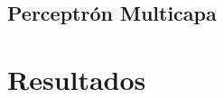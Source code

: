 \documentclass[10pt, a4paper,spanish]{article}
\begin{document}
		\subsection{Perceptrón Multicapa}

			\paragraph{}


	\section{Resultados}

		\paragraph{}
\end{document}
